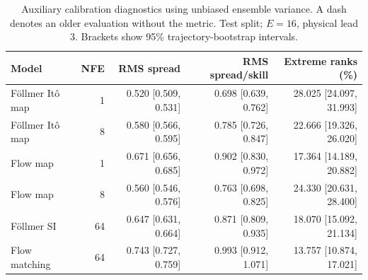 \begin{table}[t]
\centering
\small
\setlength{\tabcolsep}{3pt}
\caption{Auxiliary calibration diagnostics using unbiased ensemble variance. A dash denotes an older evaluation without the metric. Test split; $E=16$, physical lead 3. Brackets show 95\% trajectory-bootstrap intervals.}
\label{tab:map-rms-calibration}
\begin{tabular}{lrrrr}
\toprule
Model & NFE & RMS spread & RMS spread/skill & Extreme ranks (\%) \\
\midrule
Föllmer Itô map & 1 & 0.520 [0.509, 0.531] & 0.698 [0.639, 0.762] & 28.025 [24.097, 31.993] \\
Föllmer Itô map & 8 & 0.580 [0.566, 0.595] & 0.785 [0.726, 0.847] & 22.666 [19.326, 26.020] \\
\addlinespace
Flow map & 1 & 0.671 [0.656, 0.685] & 0.902 [0.830, 0.972] & 17.364 [14.189, 20.882] \\
Flow map & 8 & 0.560 [0.546, 0.576] & 0.763 [0.698, 0.825] & 24.330 [20.631, 28.400] \\
\addlinespace
Föllmer SI & 64 & 0.647 [0.631, 0.664] & 0.871 [0.809, 0.935] & 18.070 [15.092, 21.134] \\
\addlinespace
Flow matching & 64 & 0.743 [0.727, 0.759] & 0.993 [0.912, 1.071] & 13.757 [10.874, 17.021] \\
\bottomrule
\end{tabular}
\end{table}
